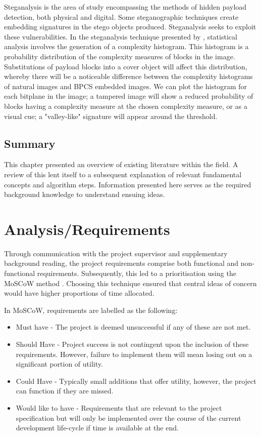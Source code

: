 \documentclass{l4proj}
\begin{document}
Steganalysis is the area of study encompassing the methods of hidden payload detection, both physical and digital. Some steganographic techniques create embedding signatures in the stego objects produced. Steganalysis seeks to exploit these vulnerabilities. In the steganalysis technique presented by \citet{valley}, statistical analysis involves the generation of a complexity histogram. This histogram is a probability distribution of the complexity measures of blocks in the image. Substitutions of payload blocks into a cover object will affect this distribution, whereby there will be a noticeable difference between the complexity histograms of natural images and BPCS embedded images. We can plot the histogram for each bitplane in the image; a tampered image will show a reduced probability of blocks having a complexity measure at the chosen complexity measure, or as a visual cue; a "valley-like" signature will appear around the threshold.

\section{Summary}

This chapter presented an overview of existing literature within the field. A review of this lent itself to a subsequent explanation of relevant fundamental concepts and algorithm steps. Information presented here serves as the required background knowledge to understand ensuing ideas.

\chapter{Analysis/Requirements} \label{Analysis}

Through communication with the project supervisor and supplementary background reading, the project requirements comprise both functional and non-functional requirements. Subsequently, this led to a prioritisation using the MoSCoW method \citep{moscow}. Choosing this technique ensured that central ideas of concern would have higher proportions of time allocated.  

In MoSCoW, requirements are labelled as the following:
\begin{itemize}
    \item Must have - The project is deemed unsuccessful if any of these are not met.
    \item Should Have - Project success is not contingent upon the inclusion of these requirements. However, failure to implement them will mean losing out on a significant portion of utility.
    \item Could Have - Typically small additions that offer utility, however, the project can function if they are missed.
    \item Would like to have - Requirements that are relevant to the project specification but will only be implemented over the course of the current development life-cycle if time is available at the end.
\end{itemize}
\end{document}
